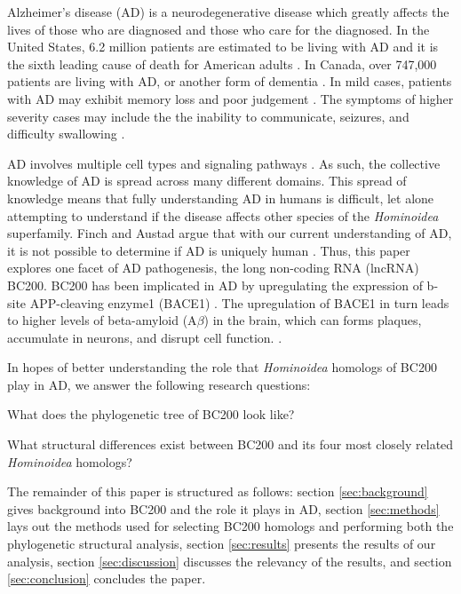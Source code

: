 \documentclass[conference, 11pt]{IEEEtran}
\begin{document}
Alzheimer's disease (AD) is a neurodegenerative disease which greatly affects the lives of those who are diagnosed and those who care for the diagnosed. 
In the United States, 6.2 million patients are estimated to be living with AD and it is the sixth leading cause of death for American adults \cite{AlzheimersDisease}. 
In Canada, over 747,000 patients are living with AD, or another form of dementia \cite{ADcanada}. 
In mild cases, patients with AD may exhibit memory loss and poor judgement \cite{alzheimersSigns}. 
The symptoms of higher severity cases may include the the inability to communicate, seizures, and difficulty swallowing \cite{alzheimersSigns}.

AD involves multiple cell types and signaling pathways \cite{zhang2021role}. 
As such, the collective knowledge of AD is spread across many different domains. 
This spread of knowledge means that fully understanding AD in humans is difficult, let alone attempting to understand if the disease affects other species of the \emph{Hominoidea} superfamily.
Finch and Austad argue that with our current understanding of AD, it is not possible to determine if AD is uniquely human \cite{finch2015commentary}. 
Thus, this paper explores one facet of AD pathogenesis, the long non-coding RNA (lncRNA) BC200. 
BC200 has been implicated in AD by upregulating the expression of b-site APP-cleaving enzyme1 (BACE1) \cite{li2018identification,zhang2021role}. 
The upregulation of BACE1 in turn leads to higher levels of beta-amyloid (A$\beta$) in the brain, which can forms plaques, accumulate in neurons, and disrupt cell function. \cite{li2018identification,zhang2021role}. 

In hopes of better understanding the role that \emph{Hominoidea} homologs of BC200 play in AD, we answer the following research questions:

\begin{questions}
  \item What does the phylogenetic tree of BC200 look like?
  \item What structural differences exist between BC200 and its four most closely related \emph{Hominoidea} homologs?
\end{questions}

The remainder of this paper is structured as follows: section \ref{sec:background} gives background into BC200 and the role it plays in AD, section \ref{sec:methods} lays out the methods used for selecting BC200 homologs and performing both the phylogenetic structural analysis, section \ref{sec:results} presents the results of our analysis, section \ref{sec:discussion} discusses the relevancy of the results, and section \ref{sec:conclusion} concludes the paper.
\end{document}
